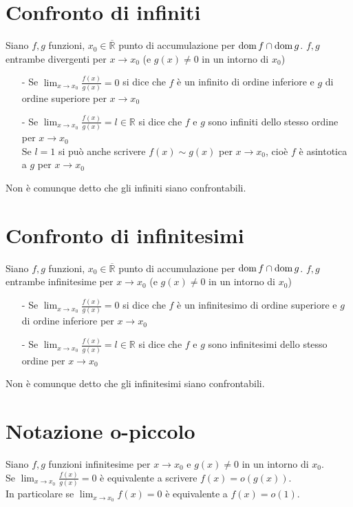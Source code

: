 \section{Confronto di infiniti}
Siano $f,g$ funzioni, $x_0 \in \overline{\mathbb{R}}$ punto di accumulazione per $\operatorname{dom} f \cap \operatorname{dom} g$. $f,g$ entrambe divergenti per $x \to x_0$ (e $g(x) \neq 0$ in un intorno di $x_0$)
\begin{enumerate}
\item[-]Se $\displaystyle \lim_{x \to x_0}\frac{f(x)}{g(x)} = 0$ si dice che $f$ è un infinito di ordine inferiore e $g$ di ordine superiore per $x \to x_0$
\item[-]Se $\displaystyle \lim_{x \to x_0}\frac{f(x)}{g(x)} = l \in \mathbb{R}$ si dice che $f$ e $g$ sono infiniti dello stesso ordine per $x \to x_0$\\
Se $l = 1$ si può anche scrivere $f(x) \sim g(x)$ per $x \to x_0$, cioè $f$ è asintotica a $g$ per $x \to x_0$ 
\end{enumerate}
Non è comunque detto che gli infiniti siano confrontabili.

\section{Confronto di infinitesimi}
Siano $f,g$ funzioni, $x_0 \in \overline{\mathbb{R}}$ punto di accumulazione per $\operatorname{dom} f \cap \operatorname{dom} g$. $f,g$ entrambe infinitesime per $x \to x_0$ (e $g(x) \neq 0$ in un intorno di $x_0$)
\begin{enumerate}
\item[-]Se $\displaystyle \lim_{x \to x_0}\frac{f(x)}{g(x)} = 0$ si dice che $f$ è un infinitesimo di ordine superiore e $g$ di ordine inferiore per $x \to x_0$
\item[-]Se $\displaystyle \lim_{x \to x_0}\frac{f(x)}{g(x)} = l \in \mathbb{R}$ si dice che $f$ e $g$ sono infinitesimi dello stesso ordine per $x \to x_0$\\
\end{enumerate}
Non è comunque detto che gli infinitesimi siano confrontabili.

\section{Notazione o-piccolo}
Siano $f,g$  funzioni infinitesime per $x \to x_0$ e $g(x) \neq 0$ in un intorno di $x_0$.\\
Se $\displaystyle \lim_{x \to x_0}\frac{f(x)}{g(x)} = 0$ è equivalente a scrivere $f(x) = o(g(x))$.\\
In particolare se $\displaystyle \lim_{x \to x_0}f(x) = 0$ è equivalente a $f(x) = o(1)$.
